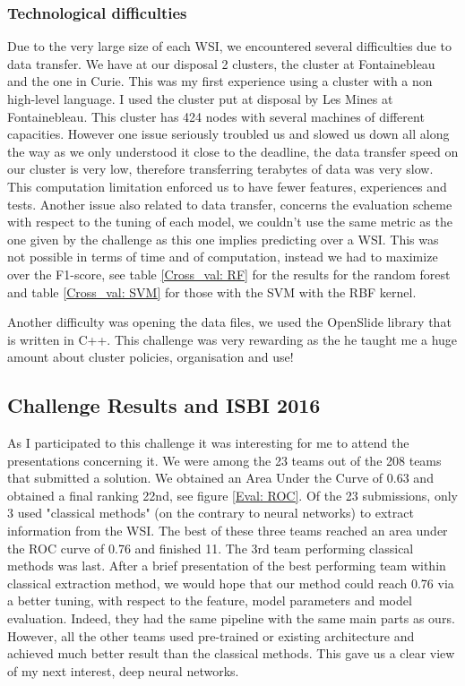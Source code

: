 \documentclass[a4paper,10pt]{article}
\begin{document}
\subsubsection*{Technological difficulties}

Due to the very large size of each WSI, we encountered several difficulties due to data transfer. We have at our disposal 2 clusters, the cluster at Fontainebleau and the one in Curie. This was my first experience using a cluster with a non high-level language. I used the cluster put at disposal by Les Mines at Fontainebleau. This cluster has 424 nodes with several machines of different capacities. However one issue seriously troubled us and slowed us down all along the way as we only understood it close to the deadline, the data transfer speed on our cluster is very low, therefore transferring terabytes of data was very slow. This computation limitation enforced us to have fewer features, experiences and tests. Another issue also related to data transfer, concerns the evaluation scheme with respect to the tuning of each model, we couldn't use the same metric as the one given by the challenge as this one implies predicting over a WSI. This was not possible in terms of time and of computation, instead we had to maximize over the F1-score, see table \ref{Cross_val: RF} for the results for the random forest and table \ref{Cross_val: SVM} for those with the SVM with the RBF kernel.

Another difficulty was opening the data files, we used the OpenSlide library that is written in C++.
This challenge was very rewarding as the he taught me a huge amount about cluster policies, organisation and use!


\subsection{Challenge Results and ISBI 2016}

As I participated to this challenge it was interesting for me to attend the presentations concerning it. We were among the 23 teams out of the 208 teams that submitted a solution. We obtained an Area Under the Curve of 0.63 and obtained a final ranking 22nd, see figure \ref{Eval: ROC}. Of the 23 submissions, only 3 used "classical methods" (on the contrary to neural networks) to extract information from the WSI. The best of these three teams reached an area under the ROC curve of 0.76 and finished 11. The 3rd team performing classical methods was last. After a brief presentation of the best performing team within classical extraction method, we would hope that our method could reach 0.76 via a better tuning, with respect to the feature, model parameters and model evaluation. Indeed, they had the same pipeline with the same main parts as ours. However, all the other teams used pre-trained or existing architecture and achieved much better result than the classical methods. This gave us a clear view of my next interest, deep neural networks.
\end{document}
